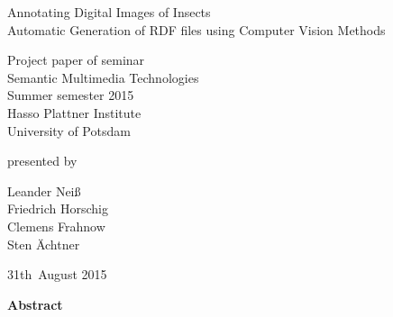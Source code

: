 \documentclass[11pt, a4paper]{article}
\begin{document}
          

\begin{titlepage}
  \begin{center} 
    \mbox{}
    \vspace{1cm}
    
    {\huge Annotating Digital Images of Insects \\[1em] {\LARGE Automatic Generation of RDF files using Computer Vision Methods}}  
        
    \vspace{4cm}
    
    Project paper of seminar \\[1em]
    {\large \sc Semantic Multimedia Technologies} \\[1em]
    Summer semester 2015 \\[1em]
    Hasso Plattner Institute \\[1em]
    University of Potsdam
    
    \vspace{4cm}
    
		presented by
		
    \vspace{1em}
    
		{\Large Leander Neiß} \\
		{\Large Friedrich Horschig}\\
		{\Large Clemens Frahnow}\\
		{\Large Sten Ächtner}
		
    \vspace{4em}
    
    31th~August 2015
  \end{center}
\end{titlepage}


\setcounter{page}{1}

\begin{center}
{\bf Abstract} 
\end{center}

\noindent


\newpage

\tableofcontents 

\newpage

 
\newpage

\newpage

\newpage

\newpage

\newpage

\newpage



\newpage




\end{document}
